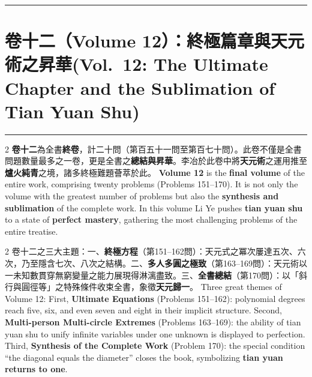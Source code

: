 \documentclass[11pt,a4paper]{article}
\newcommand{\longline}{\noindent\rule{\textwidth}{0.4pt}}
\newcommand{\shortline}{\noindent\rule{0.5\textwidth}{0.4pt}\par}
\newcommand{\bilingualsection}[2]{\section*{#1\quad(#2)}}
\begin{document}
\vspace{0.4cm}
\begin{center}
\shortline
\end{center}
\vspace{0.3cm}

\newpage
\bilingualsection{卷十二（Volume 12）：終極篇章與天元術之昇華}{Vol.\ 12: The Ultimate Chapter and the Sublimation of Tian Yuan Shu}

\longline

\begin{paracol}{2}
\textbf{卷十二}為全書\textbf{終卷}，計二十問（第百五十一問至第百七十問）。此卷不僅是全書問題數量最多之一卷，更是全書之\textbf{總結與昇華}。李冶於此卷中將\textbf{天元術}之運用推至\textbf{爐火純青}之境，諸多終極難題薈萃於此。
\switchcolumn
\textbf{Volume 12} is the \textbf{final volume} of the entire work, comprising twenty problems (Problems 151--170). It is not only the volume with the greatest number of problems but also the \textbf{synthesis and sublimation} of the complete work. In this volume Li Ye pushes \textbf{tian yuan shu} to a state of \textbf{perfect mastery}, gathering the most challenging problems of the entire treatise.
\end{paracol}

\vspace{0.3cm}

\begin{paracol}{2}
卷十二之三大主題：一、\textbf{終極方程}（第151--162問）：天元式之冪次屢達五次、六次，乃至隱含七次、八次之結構。二、\textbf{多人多圓之極致}（第163--169問）：天元術以一未知數貫穿無窮變量之能力展現得淋漓盡致。三、\textbf{全書總結}（第170問）：以「斜行與圓徑等」之特殊條件收束全書，象徵\textbf{天元歸一}。
\switchcolumn
Three great themes of Volume 12: First, \textbf{Ultimate Equations} (Problems 151--162): polynomial degrees reach five, six, and even seven and eight in their implicit structure. Second, \textbf{Multi-person Multi-circle Extremes} (Problems 163--169): the ability of tian yuan shu to unify infinite variables under one unknown is displayed to perfection. Third, \textbf{Synthesis of the Complete Work} (Problem 170): the special condition ``the diagonal equals the diameter'' closes the book, symbolizing \textbf{tian yuan returns to one}.
\end{paracol}
\end{document}
